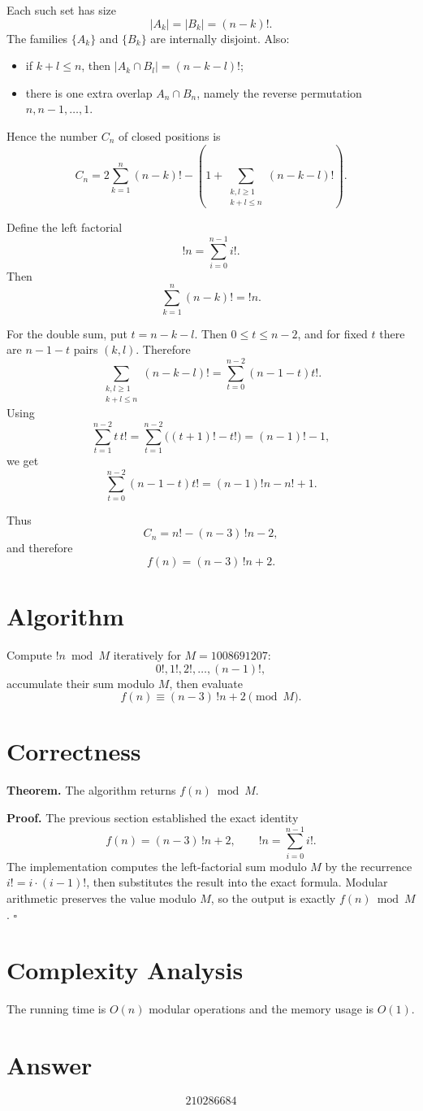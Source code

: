 \documentclass[11pt]{article}
\begin{document}
Each such set has size
\[
|A_k| = |B_k| = (n-k)!.
\]
The families $\{A_k\}$ and $\{B_k\}$ are internally disjoint. Also:
\begin{itemize}
\item if $k+l \le n$, then $|A_k \cap B_l| = (n-k-l)!$;
\item there is one extra overlap $A_n \cap B_n$, namely the reverse permutation $n,n-1,\dots,1$.
\end{itemize}

Hence the number $C_n$ of closed positions is
\[
C_n
= 2\sum_{k=1}^{n}(n-k)!
 - \left(
1 + \sum_{\substack{k,l \ge 1 \\ k+l \le n}} (n-k-l)!
\right).
\]

Define the left factorial
\[
!n = \sum_{i=0}^{n-1} i!.
\]
Then
\[
\sum_{k=1}^{n}(n-k)! = !n.
\]

For the double sum, put $t=n-k-l$. Then $0 \le t \le n-2$, and for fixed $t$ there are $n-1-t$ pairs $(k,l)$. Therefore
\[
\sum_{\substack{k,l \ge 1 \\ k+l \le n}} (n-k-l)!
= \sum_{t=0}^{n-2}(n-1-t)t!.
\]
Using
\[
\sum_{t=1}^{n-2} t\,t!
= \sum_{t=1}^{n-2}\bigl((t+1)! - t!\bigr)
= (n-1)! - 1,
\]
we get
\[
\sum_{t=0}^{n-2}(n-1-t)t!
= (n-1)!n - n! + 1.
\]

Thus
\[
C_n = n! - (n-3)\,!n - 2,
\]
and therefore
\[
f(n) = (n-3)\,!n + 2.
\]

\section{Algorithm}

Compute $!n \bmod M$ iteratively for $M=1008691207$:
\[
0!, 1!, 2!, \dots, (n-1)!,
\]
accumulate their sum modulo $M$, then evaluate
\[
f(n) \equiv (n-3)\,!n + 2 \pmod{M}.
\]

\section{Correctness}

\textbf{Theorem.} The algorithm returns $f(n) \bmod M$.

\textbf{Proof.} The previous section established the exact identity
\[
f(n) = (n-3)\,!n + 2,
\qquad
!n = \sum_{i=0}^{n-1} i!.
\]
The implementation computes the left-factorial sum modulo $M$ by the recurrence $i! = i\cdot(i-1)!$, then substitutes the result into the exact formula. Modular arithmetic preserves the value modulo $M$, so the output is exactly $f(n) \bmod M$. $\square$

\section{Complexity Analysis}

The running time is $O(n)$ modular operations and the memory usage is $O(1)$.

\section{Answer}

\[
\boxed{210286684}
\]
\end{document}

